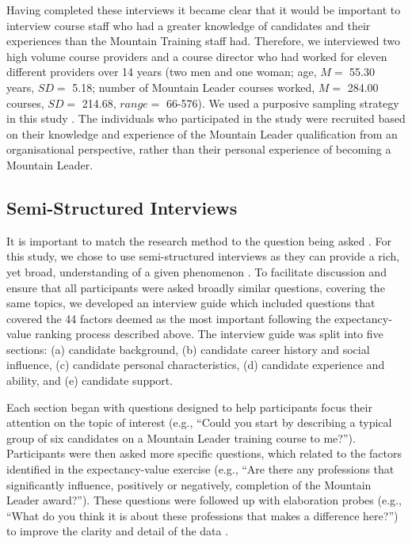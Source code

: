 \documentclass[
  12pt,
  a4paper,
]{book}
\begin{document}
Having completed these interviews it became clear that it would be important to interview course staff who had a greater knowledge of candidates and their experiences than the Mountain Training staff had. Therefore, we interviewed two high volume course providers and a course director who had worked for eleven different providers over 14 years (two men and one woman; age, \(M =\) 55.30 years, \(SD =\) 5.18; number of Mountain Leader courses worked, \(M =\) 284.00 courses, \(SD =\) 214.68, \(range =\) 66-576). We used a purposive sampling strategy in this study \citep{Patton2002, Sparkes2014}. The individuals who participated in the study were recruited based on their knowledge and experience of the Mountain Leader qualification from an organisational perspective, rather than their personal experience of becoming a Mountain Leader.

\hypertarget{semi-structured-interviews}{%
\subsection{Semi-Structured Interviews}\label{semi-structured-interviews}}

It is important to match the research method to the question being asked \citep{Smith2016}. For this study, we chose to use semi-structured interviews as they can provide a rich, yet broad, understanding of a given phenomenon \citep{Lincoln1985}. To facilitate discussion and ensure that all participants were asked broadly similar questions, covering the same topics, we developed an interview guide which included questions that covered the 44 factors deemed as the most important following the expectancy-value ranking process described above. The interview guide was split into five sections: (a) candidate background, (b) candidate career history and social influence, (c) candidate personal characteristics, (d) candidate experience and ability, and (e) candidate support.

Each section began with questions designed to help participants focus their attention on the topic of interest (e.g., ``Could you start by describing a typical group of six candidates on a Mountain Leader training course to me?''). Participants were then asked more specific questions, which related to the factors identified in the expectancy-value exercise (e.g., ``Are there any professions that significantly influence, positively or negatively, completion of the Mountain Leader award?''). These questions were followed up with elaboration probes (e.g., ``What do you think it is about these professions that makes a difference here?'') to improve the clarity and detail of the data \citep{Patton2002}.
\end{document}
